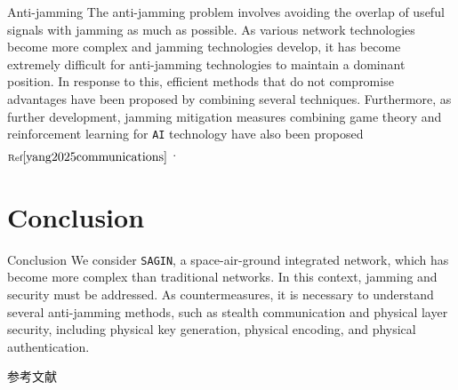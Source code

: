 \documentclass[11pt]{beamer}
\begin{document}
\begin{frame}{Anti-jamming}
  The anti-jamming problem involves avoiding the overlap of useful signals with jamming as much as possible. As various network technologies become more complex and jamming technologies develop, it has become extremely difficult for anti-jamming technologies to maintain a dominant position. In response to this, efficient methods that do not compromise advantages have been proposed by combining several techniques. Furthermore, as further development, jamming mitigation measures combining game theory and reinforcement learning for \texttt{AI} technology have also been proposed$_{\text{Ref}\cite{yang2025communications}}$ .
\end{frame}

\section{Conclusion}

\begin{frame}{Conclusion}
  We consider \texttt{SAGIN}, a space-air-ground integrated network, which has become more complex than traditional networks. In this context, jamming and security must be addressed. As countermeasures, it is necessary to understand several anti-jamming methods, such as stealth communication and physical layer security, including physical key generation, physical encoding, and physical authentication.
\end{frame}

\begin{frame}[allowframebreaks]{参考文献}
\end{frame}
\end{document}
